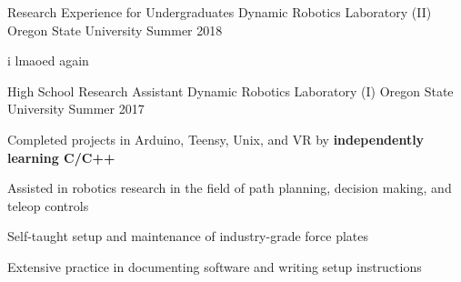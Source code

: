 

\begin{cventries}

  \cventry
    {Research Experience for Undergraduates} %
    {Dynamic Robotics Laboratory (II)} %
    {Oregon State University} %
    {Summer 2018} %
    {
      \begin{cvitems} %
        \item {i lmaoed again}
      \end{cvitems}
    }
  



  \cventry
    {High School Research Assistant} %
    {Dynamic Robotics Laboratory (I)} %
    {Oregon State University} %
    {Summer 2017} %
    {
      \begin{cvitems} %
        \item {Completed projects in Arduino, Teensy, Unix, and VR by \textbf{independently learning C/C++} }
        \item {Assisted in robotics research in the field of path planning, decision making, and teleop controls}
        \item {Self-taught setup and maintenance of industry-grade force plates}
        \item {Extensive practice in documenting software and writing setup instructions}
      \end{cvitems}
    }





\end{cventries}
